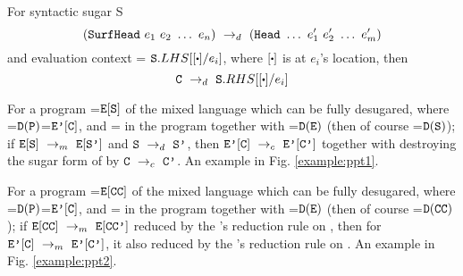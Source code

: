 \begin{Def}
	For syntactic sugar S
	\[
	(\mbox{\tt SurfHead}~e_1~e_2~\ldots~e_n) ~\rightarrow_d~ (\mbox{\tt Head}~\ldots~e_1'~e_2'~\ldots~e_m')
	\]
	and evaluation context  = $\m{S}.LHS[[\bigcdot]/e_i]$, where $[\bigcdot]$ is at $e_i$'s location, then
	\[
	\drule{\m{C}}{\m{S}.RHS[[\bigcdot]/e_i]}
	\]
	
	\end{Def}


\begin{property} \label{thm1} 
	For a program =$\mbox{\tt E}[\mbox{\tt S}]$ of the mixed language which can be fully desugared, where =$\mathtt{D}(\mbox{\tt P})$=$\mbox{\tt E'}[\mbox{\tt C}]$, and = in the program  together with =$\mathtt{D}(\mbox{\tt E})$ (then of course =$\mathtt{D}(\mbox{\tt S})$); if $\mbox{\tt E}[\mbox{\tt S}] ~\rightarrow_m~\mbox{\tt E}[\mbox{\tt S'}]$ and $\mbox{\tt S} ~\rightarrow_d~ \mbox{\tt S'}$, then $\mbox{\tt E'}[\mbox{\tt C}] ~\rightarrow_c~\mbox{\tt E'}[\mbox{\tt C'}]$ together with destroying the sugar form of  by $\mbox{\tt C} ~\rightarrow_c~\mbox{\tt C'}$. An example in Fig. \ref{example:ppt1}.
\end{property}

\begin{property} \label{thm2} 
	For a program =$\mbox{\tt E}[\mbox{\tt CC}]$ of the mixed language which can be fully desugared, where =$\mathtt{D}(\mbox{\tt P})$=$\mbox{\tt E'}[\mbox{\tt C}]$, and = in the program  together with =$\mathtt{D}(\mbox{\tt E})$ (then of course =$\mathtt{D}(\mbox{\tt CC})$); if $\mbox{\tt E}[\mbox{\tt CC}] ~\rightarrow_m~\mbox{\tt E}[\mbox{\tt CC'}]$ reduced by the 's reduction rule on , then for $\mbox{\tt E'}[\mbox{\tt C}] ~\rightarrow_m~\mbox{\tt E'}[\mbox{\tt C'}]$, it also reduced by the 's reduction rule on . An example in Fig. \ref{example:ppt2}.
\end{property}

